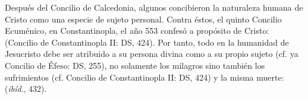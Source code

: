  Después del Concilio de Calcedonia, algunos concibieron la naturaleza humana de Cristo como una especie de sujeto personal. Contra éstos, el quinto Concilio Ecuménico, en Constantinopla, el año 553 confesó a propósito de Cristo:  (Concilio de Constantinopla II: DS, 424). Por tanto, todo en la humanidad de Jesucristo debe ser atribuido a su persona divina como a su propio sujeto (cf. ya Concilio de Éfeso: DS, 255), no solamente los milagros sino también los sufrimientos (cf. Concilio de Constantinopla II: DS, 424) y la misma muerte:  (\emph{ibíd}., 432).